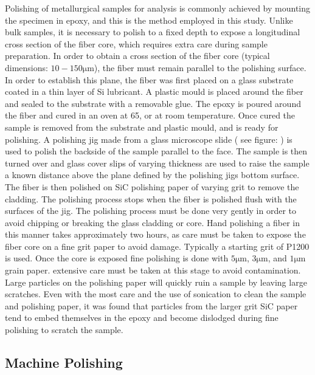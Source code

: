 Polishing of metallurgical samples for analysis is commonly achieved by mounting the specimen in epoxy, and this is the method employed in this study. Unlike bulk samples, it is necessary to polish to a fixed depth to expose a longitudinal cross section of the fiber core, which requires extra care during sample preparation. In order to obtain a cross section of the fiber core (typical dimensions: $10 - 150 \si{\micro\meter}$), the fiber must remain parallel to the polishing surface. In order to establish this plane, the fiber was first placed on a glass substrate coated in a thin layer of Si lubricant. A plastic mould is placed around the fiber and sealed to the substrate with a removable glue. The epoxy is poured around the fiber and cured in an oven at 65, or at room temperature. Once cured the sample is removed from the substrate and plastic mould, and is ready for polishing. A polishing jig made from a glass microscope slide ( see figure: ) is used to polish the backside of the sample parallel to the face. The sample is then turned over and glass cover slips of varying thickness are used to raise the sample a known distance above the plane defined by the polishing jigs bottom surface. The fiber is then polished on SiC polishing paper of varying grit to remove the cladding. The polishing process stops when the fiber is polished flush with the surfaces of the jig. The polishing process must be done very gently in order to avoid chipping or breaking the glass cladding or core. Hand polishing a fiber in this manner takes approximately two hours, as care must be taken to expose the fiber core on a fine grit paper to avoid damage. Typically a  starting grit of P1200 is used. Once the core is exposed fine polishing is done with $5 \si{\micro\meter}$, $3 \si{\micro\meter}$, and $1 \si{\micro\meter}$ grain paper. extensive care must be taken at this stage to avoid contamination. Large particles on the polishing paper will quickly ruin a sample by leaving large scratches. Even with the most care and the use of sonication to clean the sample and polishing paper, it was found that particles from the larger grit SiC paper tend to embed themselves in the epoxy and become dislodged during fine polishing to scratch the sample. 


\subsection{Machine Polishing}

